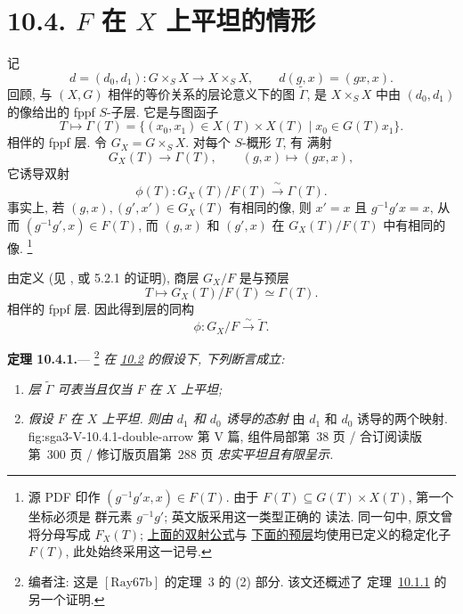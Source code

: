 \section*{10.4. \(F\) 在 \(X\) 上平坦的情形}
\label{sec:sga3-V-10.4}

记
\[
  d=(d_0,d_1):G\times_SX\longrightarrow X\times_SX,
  \qquad d(g,x)=(gx,x).
\]
回顾, 与 \((X,G)\) 相伴的等价关系的层论意义下的图
\(\widetilde\Gamma\), 是 \(X\times_SX\) 中由
\((d_0,d_1)\) 的像给出的 fppf
\(S\)-子层. 它是与图函子
\[
  T\longmapsto
  \Gamma(T)=\bigl\{(x_0,x_1)\in X(T)\times X(T)
  \mathrel{|} x_0\in G(T)x_1\bigr\}.
\]
相伴的 fppf 层.
令 \(G_X=G\times_SX\). 对每个 \(S\)-概形 \(T\), 有
满射
\[
  G_X(T)\longrightarrow\Gamma(T),
  \qquad (g,x)\longmapsto(gx,x),
\]
它诱导双射%
\label{eq:sga3-V-10.4-phiT-bijection}%
\[
  \phi(T):G_X(T)/F(T)\xrightarrow{\ \sim\ }\Gamma(T).
\]
事实上, 若 \((g,x),(g',x')\in G_X(T)\) 有相同的像, 则
\(x'=x\) 且 \(g^{-1}g'x=x\), 从而
\((g^{-1}g',x)\in F(T)\), 而 \((g,x)\) 和 \((g',x)\) 在
\(G_X(T)/F(T)\) 中有相同的像.%
\footnote{\label{source-note:sga3-V-10.4-ft-typing}源 PDF 印作
\((g^{-1}g'x,x)\in F(T)\). 由于
\(F(T)\subseteq G(T)\times X(T)\), 第一个坐标必须是
群元素 \(g^{-1}g'\); 英文版采用这一类型正确的
读法. 同一句中, 原文曾将分母写成 \(F_X(T)\);
\hyperref[eq:sga3-V-10.4-phiT-bijection]{上面的双射公式}与
\hyperref[eq:sga3-V-10.4-quotient-presheaf]{下面的预层}均使用已定义的稳定化子 \(F(T)\),
此处始终采用这一记号.}

由定义 (见 , 或 5.2.1 的证明),
商层 \(G_X/F\) 是与预层%
\label{eq:sga3-V-10.4-quotient-presheaf}%
\[
  T\longmapsto G_X(T)/F(T)\simeq\Gamma(T).
\]
相伴的 fppf 层.
因此得到层的同构
\[
  \phi:G_X/F\xrightarrow{\ \sim\ }\widetilde\Gamma.
\]

\medskip
{}\label{thm:sga3-V-10.4.1}%
\noindent\textbf{定理 10.4.1.}---%
\footnote{\label{note:sga3-V-51}编者注: 这是
\(\hyperref[bib:sga3-V-Ray67b]{[\mathrm{Ray67b}]}\) 的定理~3 的 (2) 部分. 该文还概述了
定理~\hyperref[thm:sga3-V-10.1.1]{10.1.1} 的另一个证明.}
\textit{在 \hyperref[sec:sga3-V-10.2]{10.2} 的假设下,
下列断言成立:}
\begin{enumerate}
\item[\textit{a)}]\label{thm:sga3-V-10.4.1-a}%
  \textit{层 \(\widetilde\Gamma\) 可表当且仅当
  \(F\) 在 \(X\) 上平坦;}
\item[\textit{b)}]\label{thm:sga3-V-10.4.1-b}%
  \textit{假设 \(F\) 在 \(X\) 上平坦. 则由 \(d_1\) 和 \(d_0\)
  诱导的态射}
    {由 \(d_1\) 和 \(d_0\) 诱导的两个映射.}
    {fig:sga3-V-10.4.1-double-arrow}
    {第 V 篇, 组件局部第~38 页 / 合订阅读版第~300 页 /
     修订版页眉第~288 页}
  \textit{忠实平坦且有限呈示.}
\end{enumerate}


